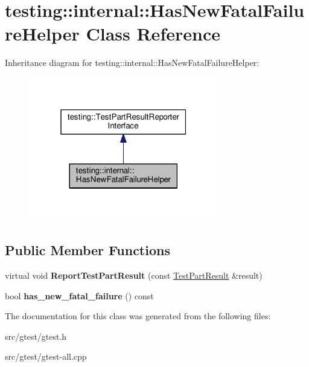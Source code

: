 \hypertarget{classtesting_1_1internal_1_1_has_new_fatal_failure_helper}{}\section{testing\+:\+:internal\+:\+:Has\+New\+Fatal\+Failure\+Helper Class Reference}
\label{classtesting_1_1internal_1_1_has_new_fatal_failure_helper}


Inheritance diagram for testing\+:\+:internal\+:\+:Has\+New\+Fatal\+Failure\+Helper\+:
\nopagebreak
\begin{figure}[H]
\begin{center}
\leavevmode
\includegraphics[width=235pt]{classtesting_1_1internal_1_1_has_new_fatal_failure_helper__inherit__graph}
\end{center}
\end{figure}
\subsection*{Public Member Functions}
\begin{DoxyCompactItemize}
\item 
\mbox{\label{classtesting_1_1internal_1_1_has_new_fatal_failure_helper_a2d2e1faa1f3669b82810df97ac678a27}} 
virtual void {\bfseries Report\+Test\+Part\+Result} (const \mbox{\hyperlink{classtesting_1_1_test_part_result}{Test\+Part\+Result}} \&result)
\item 
\mbox{\label{classtesting_1_1internal_1_1_has_new_fatal_failure_helper_a91b7bac47f09076db4be0304a2110a9e}} 
bool {\bfseries has\+\_\+new\+\_\+fatal\+\_\+failure} () const
\end{DoxyCompactItemize}


The documentation for this class was generated from the following files\+:\begin{DoxyCompactItemize}
\item 
src/gtest/gtest.\+h\item 
src/gtest/gtest-\/all.\+cpp\end{DoxyCompactItemize}
